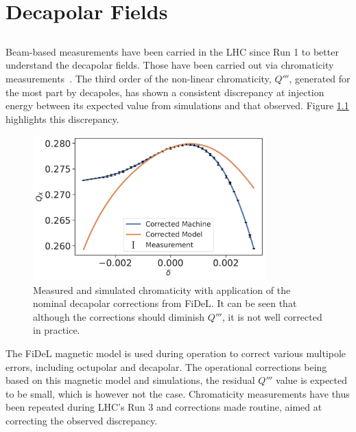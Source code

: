 \chapter{Decapolar Fields}
\thumbforchapter{}

\section{}

\subsection{}

Beam-based measurements have been carried in the LHC since Run 1 to better understand the decapolar
fields. Those have been carried out via chromaticity
measurements~\cite{maclean_non-linear_2011,maclean_commissioning_2016,maclean_measurement_2014}. 
The third order of the non-linear chromaticity, $Q'''$, generated for the most part by decapoles,
has shown a consistent discrepancy at injection energy between its expected value from simulations
and that observed. Figure \ref{fig:decapoles:bare_chroma_vs_simulations} highlights this
discrepancy.

\begin{figure}[!htb]
    \centering
    \includegraphics[width=0.8\textwidth]{images/dq3_corrected_simulation_fidel.pdf}
    \caption{Measured and simulated chromaticity with application of the nominal decapolar
    corrections from FiDeL. It can be seen that although the corrections should diminish $Q'''$, it
    is not well corrected in practice.}
    \label{fig:decapoles:bare_chroma_vs_simulations}
\end{figure}

The FiDeL magnetic model is used during operation to correct various multipole errors, including
octupolar and decapolar. The operational corrections being based on this magnetic model and
simulations, the residual $Q'''$ value is expected to be small, which is however not the case.
Chromaticity measurements have thus been repeated during LHC's Run 3 and corrections made routine,
aimed at correcting the observed discrepancy.

